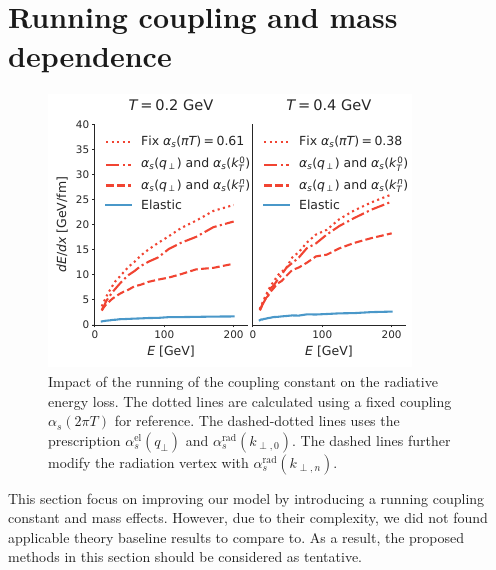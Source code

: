 \documentclass[aps, prc, reprint, amsmath, groupedaddress, nofootinbib]{revtex4-1}
\begin{document}
\section{Running coupling and mass dependence}\label{section:disscuss}
\begin{figure}
\includegraphics[width=\columnwidth]{Eloss_infinite_run.pdf}
\caption{Impact of the running of the coupling constant on the radiative energy loss. The dotted lines are calculated using a fixed coupling $\alpha_s(2\pi T)$ for reference. The dashed-dotted lines uses the prescription $\alpha_s^{\textrm{el}}(q_\perp)$ and $\alpha_s^{\textrm{rad}}(k_{\perp,0})$. The dashed lines further modify the radiation vertex with $\alpha_s^{\textrm{rad}}(k_{\perp,n})$.}
\label{fig:run}
\end{figure}
This section focus on improving our model by introducing a running coupling constant and mass effects. 
However, due to their complexity, we did not found applicable theory baseline results to compare to.
As a result, the proposed methods in this section should be considered as tentative.
\end{document}
